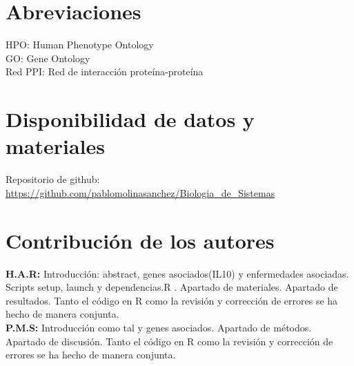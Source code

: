 \documentclass{bmcart}
\begin{document}
	\begin{backmatter}
	
		\section*{Abreviaciones}%
		HPO: Human Phenotype Ontology \\
		GO: Gene Ontology \\
		Red PPI: Red de interacción proteína-proteína
		
		\section*{Disponibilidad de datos y materiales}%
		Repositorio de github: \url{https://github.com/pablomolinasanchez/Biologia_de_Sistemas}
		
		\section*{Contribución de los autores}
		\textbf{H.A.R:} Introducción: abstract, genes asociados(IL10) y enfermedades asociadas. Scripts setup, launch y dependencias.R . Apartado de materiales. Apartado de resultados. Tanto el código en R como la revisión y corrección de errores se ha hecho de manera conjunta. \\
		\textbf{P.M.S:} Introducción como tal y genes asociados. Apartado de métodos. Apartado de discusión. Tanto el código en R como la revisión y corrección de errores se ha hecho de manera conjunta.
			
		
		
	\end{backmatter}
\end{document}
